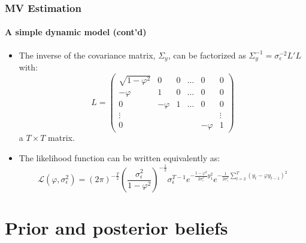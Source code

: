 \documentclass[10pt,slidestop]{beamer}
\begin{document}
\begin{frame}
  \frametitle{MV Estimation}
  \framesubtitle{A simple dynamic model (cont'd)}

    \begin{itemize}
      \item The inverse of the covariance
      matrix, $\Sigma_y$, can be factorized as $\Sigma_y ^{-1}=
      \sigma_{\epsilon}^{-2}L'L$ with:
      {\tiny\[
        L =
        \begin{pmatrix}
          \sqrt{1-\varphi^2} & 0 & 0 & \dots & 0 & 0\\
          -\varphi & 1 & 0 &\dots & 0 & 0 \\
          0 & -\varphi & 1 & \dots & 0 & 0 \\
          \vdots & &&&& \vdots \\
          0 & &&&-\varphi & 1
        \end{pmatrix}
      \]}
    a $T\times T$ matrix. 
    \item The likelihood function can be
    written equivalently as:
    \[
    \mathcal L(\varphi,\sigma_{\epsilon}^2) =
    (2\pi)^{-\frac{T}{2}}\left(\frac{\sigma_{\epsilon}^2}{1-\varphi^2}\right)^{-\frac{1}{2}}\sigma_{\epsilon}^{T-1}
    e^{-\frac{1-\varphi^2}{2\sigma_{\epsilon}^2}y_1^2}e^{-\frac{1}{2\sigma_{\epsilon}^2}\sum_{t=2}^T\left(y_t-\varphi
      y_{t-1}\right)^2}
    \]
    \end{itemize}
  \end{frame}

\section{Prior and posterior beliefs}
\end{document}
